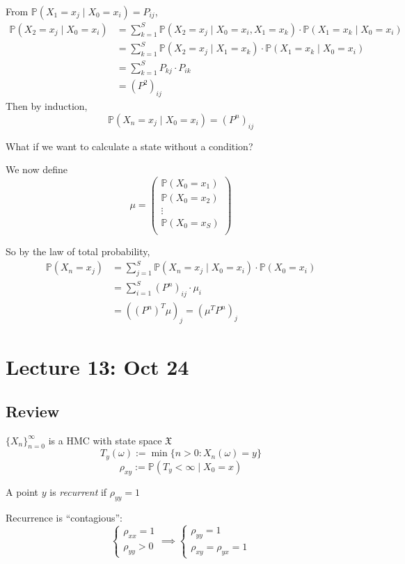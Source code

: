 \documentclass[12pt]{article}
\renewcommand{\P}{\mathbb{P}}
\newcommand{\mfX}{\mathfrak{X}}
\begin{document}
From $\P(X_1 = x_j \; | \; X_0 = x_i) = P_{ij}$, 
\begin{align*}
    \P(X_2 = x_j \; | \; X_0 = x_i) &= \sum_{k=1}^S \P(X_2 = x_j \; | \; X_0 = x_i, X_1 = x_k) \cdot \P(X_1 = x_k \; | \; X_0 = x_i)\\
    &= \sum_{k=1}^S \P(X_2 = x_j \; | \; X_1 = x_k) \cdot \P(X_1 = x_k \; | \; X_0 = x_i)\\
    &= \sum_{k=1}^S P_{kj} \cdot P_{ik}\\
    &= (P^2)_{ij}
\end{align*}
Then by induction, 
\[\P(X_n = x_j \; | \; X_0 = x_i) = (P^n)_{ij}\]

What if we want to calculate a state without a condition? 

We now define 
\[\mu = \begin{pmatrix}
    \P(X_0 = x_1)\\
    \P(X_0 = x_2)\\
    \vdots\\
    \P(X_0 = x_S)\\
\end{pmatrix}\]

So by the law of total probability, 
\begin{align*}
    \P(X_n = x_j) &= \sum_{j=1}^S \P(X_n = x_j \; | \; X_0 = x_i) \cdot \P(X_0 = x_i)\\
    &= \sum_{i=1}^S (P^n)_{ij}\cdot  \mu_i\\
    &= ((P^n)^T \mu)_j = (\mu^T P^n)_j
\end{align*}

\section{Lecture 13: Oct 24}
\subsection{Review}
$\{X_n\}_{n=0}^\infty$ is a HMC with state space $\mfX$ 
\[T_y(\omega) := \min \{n > 0: X_n(\omega) = y\}\]
\[\rho_{xy} := \P(T_y < \infty \; | \; X_0 = x)\]

A point $y$ is \emph{recurrent} if $\rho_{yy} = 1$ 

Recurrence is ``contagious'':
\[\begin{cases}
    \rho_{xx} = 1\\
    \rho_{yy} > 0
\end{cases} \implies \begin{cases}
    \rho_{yy} = 1\\
    \rho_{xy} = \rho_{yx} = 1
\end{cases} \]
\end{document}
